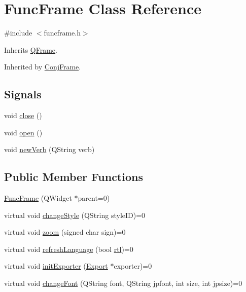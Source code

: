 \hypertarget{class_func_frame}{}\section{Func\+Frame Class Reference}
\label{class_func_frame}


{\ttfamily \#include $<$funcframe.\+h$>$}



Inherits \hyperlink{class_q_frame}{Q\+Frame}.



Inherited by \hyperlink{class_conj_frame}{Conj\+Frame}.

\subsection*{Signals}
\begin{DoxyCompactItemize}
\item 
void \hyperlink{class_func_frame_a8c1de1e64822b12e21279ddee89d2c5c}{close} ()
\item 
void \hyperlink{class_func_frame_ac207df67eedfb7befd9c4eff4adb055b}{open} ()
\item 
void \hyperlink{class_func_frame_a7e5ad4d47567e5564bc462175b0fa824}{new\+Verb} (Q\+String verb)
\end{DoxyCompactItemize}
\subsection*{Public Member Functions}
\begin{DoxyCompactItemize}
\item 
\hyperlink{class_func_frame_acca8a9c9f954e66a1ea9cd75f1272cfe}{Func\+Frame} (Q\+Widget $\ast$parent=0)
\item 
virtual void \hyperlink{class_func_frame_abad791bdc2a791af1ae13fd864bf984d}{change\+Style} (Q\+String style\+ID)=0
\item 
virtual void \hyperlink{class_func_frame_a0872b6db14e325d2637ad405bb0de947}{zoom} (signed char sign)=0
\item 
virtual void \hyperlink{class_func_frame_ac6c816ef397c59a30448ca4fd51672f2}{refresh\+Language} (bool \hyperlink{class_func_frame_a9afcf2865055116446b9f50406bb1c12}{rtl})=0
\item 
virtual void \hyperlink{class_func_frame_ab4fc9921002677a89b5ddaa87e403a3c}{init\+Exporter} (\hyperlink{class_export}{Export} $\ast$exporter)=0
\item 
virtual void \hyperlink{class_func_frame_a216cb113ba196d4ec4f18fe403c9ee05}{change\+Font} (Q\+String font, Q\+String jpfont, int size, int jpsize)=0
\end{DoxyCompactItemize}
